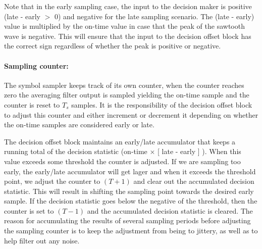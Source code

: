 Note that in the early sampling case, the input to the decision
maker is positive (late - early $>$ 0) and negative for the late
sampling scenario.  The (late - early) value is multiplied
by the on-time value in case that the peak of the sawtooth
wave is negative.  This will ensure that the input to the
decision offset block has the correct sign regardless of whether
the peak is positive or negative.

\paragraph{Sampling counter:}

The symbol sampler keeps track of its own counter, when the
counter reaches zero the averaging filter output is sampled
yielding the on-time sample and the counter is reset to $T_s$
samples.  It is the responsibility of the decision offset block
to adjust this counter and either increment or decrement it
depending on whether the on-time samples are considered early
or late.

The decision offset block maintains an early/late accumulator
that keeps a running total of the decision statistic (on-time $\times$
[ late - early ] ). When this value exceeds some
threshold the counter is adjusted.
If we are sampling too early, the early/late accumulator will get lager
and when it exceeds the threshold point, we adjust the
counter to $(T+1)$ and clear out the accumulated decision
statistic.  This will result in shifting the sampling point
towards the desired early sample.  If the decision
statistic goes below the negative of the threshold, then
the counter is set to $(T-1)$ and the accumulated decision
statistic is cleared.
The reason for accumulating the results of several sampling
periods before adjusting the sampling counter is to keep
the adjustment from being to jittery, as well as to help
filter out any noise.
